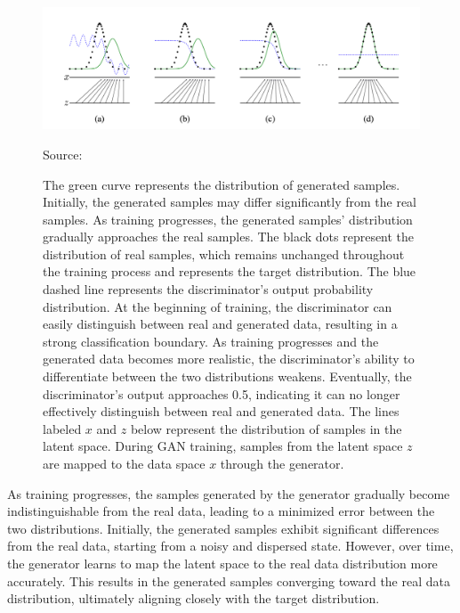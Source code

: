 \begin{figure}[H]
    \centering
    \includegraphics[width=1.2\linewidth]{./Images/data_distribution.jpg}
    \caption[Diagram of GAN's Training Process.]{ 
    The green curve represents the distribution of generated samples. Initially, the generated samples may differ significantly from the real samples. As training progresses, the generated samples' distribution gradually approaches the real samples.
    The black dots represent the distribution of real samples, which remains unchanged throughout the training process and represents the target distribution.
    The blue dashed line represents the discriminator's output probability distribution. At the beginning of training, the discriminator can easily distinguish between real and generated data, resulting in a strong classification boundary. As training progresses and the generated data becomes more realistic, the discriminator's ability to differentiate between the two distributions weakens. Eventually, the discriminator's output approaches 0.5, indicating it can no longer effectively distinguish between real and generated data.
    The lines labeled $x$ and $z$ below represent the distribution of samples in the latent space. During GAN training, samples from the latent space $z$ are mapped to the data space $x$ through the generator.
    }
    \label{fig:gan_training_process}
    \vspace{1pt} %
    \small{Source: \cite{goodfellow2014generative}}
\end{figure}

As training progresses, the samples generated by the generator gradually become indistinguishable from the real data, leading to a minimized error between the two distributions. Initially, the generated samples exhibit significant differences from the real data, starting from a noisy and dispersed state. However, over time, the generator learns to map the latent space to the real data distribution more accurately. This results in the generated samples converging toward the real data distribution, ultimately aligning closely with the target distribution.


